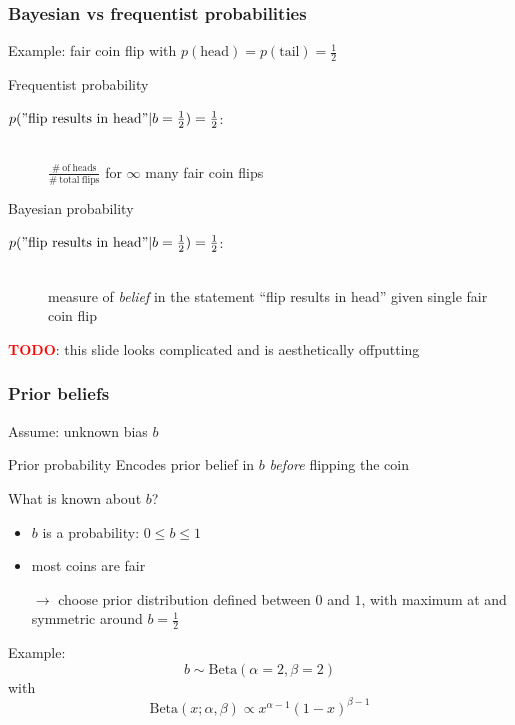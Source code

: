 \documentclass[t,aspectratio=169]{beamer}
\newcommand{\todo}{\textcolor{red}{\textbf{TODO}}}
\begin{document}
\begin{frame}
  \frametitle{Bayesian vs frequentist probabilities}
  Example: fair coin flip with $p(\mathrm{head}) = p(\mathrm{tail}) = \frac{1}{2}$
  \begin{tcolorbox}{Frequentist probability}
    \begin{description}
    \item[$p(\mathrm{"flip\ results\ in\ head"}|b=\frac{1}{2})=\frac{1}{2}$:] \hfill \\ $\frac{\mathrm{\# \ of \ heads}}{\mathrm{\# \ total \ flips}}$ for $\infty$ many fair coin flips
    \end{description}
  \end{tcolorbox}
  \begin{tcolorbox}{Bayesian probability}
    \begin{description}
    \item[$p(\mathrm{"flip\ results\ in\ head"}|b=\frac{1}{2})=\frac{1}{2}$:] \hfill \\ measure of \textit{belief} in the statement ``flip results in head'' given single fair coin flip
    \end{description}
  \end{tcolorbox}
  \todo: this slide looks complicated and is aesthetically offputting
\end{frame}


\begin{frame}
  \frametitle{Prior beliefs}
  Assume: unknown bias $b$
  \begin{tcolorbox}{Prior probability}
    Encodes prior belief in $b$ \textit{before} flipping the coin
  \end{tcolorbox}
  What is known about $b$?
  \begin{itemize}
  \item $b$ is a probability: $0 \leq b \leq 1$
  \item most coins are fair
  \end{itemize}
  \begin{itemize}
  \item[$\rightarrow$] choose prior distribution defined between $0$ and $1$, with maximum at and symmetric around $b=\frac{1}{2}$
  \end{itemize}
  Example:
  \begin{equation*}
    b \sim \mathrm{Beta}(\alpha=2,\beta=2)
  \end{equation*}
  with
  \begin{equation*}
    \mathrm{Beta}(x;\alpha, \beta) \propto x^{\alpha-1}(1-x)^{\beta-1}
  \end{equation*}
\end{frame}
\end{document}
